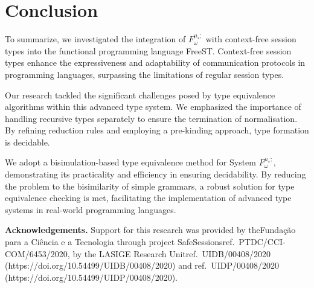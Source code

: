 \section{Conclusion}\label{sec:conclusion}
To summarize, we investigated the integration of  $F^{\mu_*;}_\omega$ with context-free session types into the functional programming language FreeST. Context-free session types enhance the expressiveness and adaptability of communication protocols in programming languages, surpassing the limitations of regular session types. 

Our research tackled the significant challenges posed by type equivalence algorithms within this advanced type system. We emphasized the importance of handling recursive types separately to ensure the termination of normalisation. By refining reduction rules and employing a pre-kinding approach, type formation is decidable.

We adopt a bisimulation-based type equivalence method for System $F^{\mu_*;}_\omega$, demonstrating its practicality and efficiency in ensuring decidability. By reducing the problem to the bisimilarity of simple grammars, a robust solution for type equivalence checking is met, facilitating the implementation of advanced type systems in real-world programming languages.
\medskip

\noindent \textbf{Acknowledgements.} Support for this research was provided by the\linebreak Fundação para a Ciência e a Tecnologia through project SafeSessions\linebreak ref.\ PTDC/CCI-COM/6453/2020, by the LASIGE Research Unit\linebreak ref.\ UIDB/00408/2020 (https://doi.org/10.54499/UIDB/00408/2020) and ref.\ UIDP/00408/2020 (https://doi.org/10.54499/UIDP/00408/2020).

